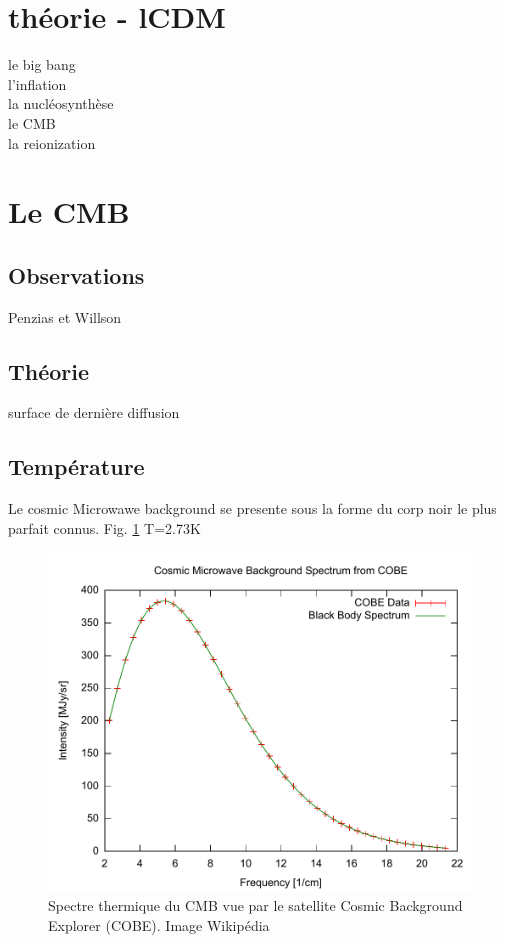 \section{théorie - lCDM}

le big bang\\
l'inflation\\
la nucléosynthèse\\
le CMB\\
la reionization


\section{Le CMB}


\subsection{Observations}

Penzias et Willson

\subsection{Théorie}

surface de dernière diffusion


\subsection{Température}
Le cosmic Microwawe background se presente sous la forme du corp noir le plus parfait connus.
Fig. \ref{fig:cmb_thermal_spectrum}
T=2.73K


\begin{figure}[bth]
        \includegraphics[width=.95\linewidth]{img/01/Cmbr.pdf} 
        \caption{Spectre thermique du CMB vue par le satellite Cosmic Background Explorer (COBE). 
        Image Wikipédia}
 		\label{fig:cmb_thermal_spectrum}
\end{figure}




